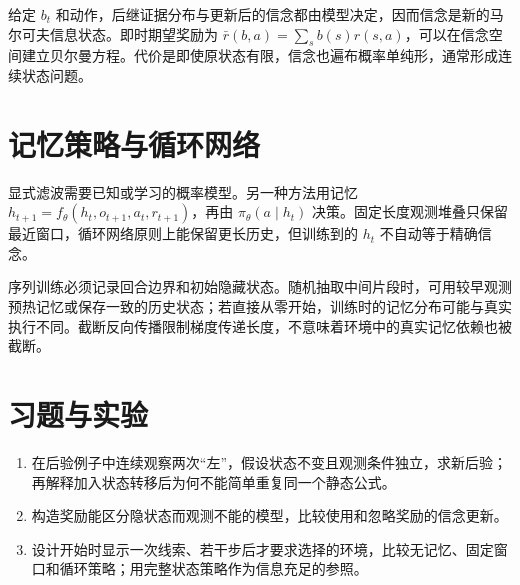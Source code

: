 给定 $b_t$ 和动作，后继证据分布与更新后的信念都由模型决定，因而信念是新的马尔可夫信息状态。即时期望奖励为 $\bar r(b,a)=\sum_s b(s)r(s,a)$，可以在信念空间建立贝尔曼方程。代价是即使原状态有限，信念也遍布概率单纯形，通常形成连续状态问题。

\section{记忆策略与循环网络}

显式滤波需要已知或学习的概率模型。另一种方法用记忆 $h_{t+1}=f_\theta(h_t,o_{t+1},a_t,r_{t+1})$，再由 $\pi_\theta(a\mid h_t)$ 决策。固定长度观测堆叠只保留最近窗口，循环网络原则上能保留更长历史，但训练到的 $h_t$ 不自动等于精确信念。

序列训练必须记录回合边界和初始隐藏状态。随机抽取中间片段时，可用较早观测预热记忆或保存一致的历史状态；若直接从零开始，训练时的记忆分布可能与真实执行不同。截断反向传播限制梯度传递长度，不意味着环境中的真实记忆依赖也被截断。

\section{习题与实验}
\begin{enumerate}
\item 在后验例子中连续观察两次“左”，假设状态不变且观测条件独立，求新后验；再解释加入状态转移后为何不能简单重复同一个静态公式。
\item 构造奖励能区分隐状态而观测不能的模型，比较使用和忽略奖励的信念更新。
\item 设计开始时显示一次线索、若干步后才要求选择的环境，比较无记忆、固定窗口和循环策略；用完整状态策略作为信息充足的参照。
\end{enumerate}





